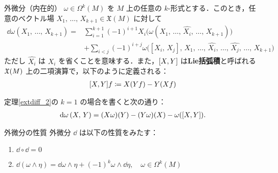 \documentclass[geometry_main]{subfiles}
\begin{document}
\begin{mytheo}[label=extdiff_2]{外微分（内在的）}
	$\omega \in \Omega^k(M)$ を $M$ 上の任意の $k$-形式とする．このとき，任意のベクトル場 $X_1,\, \dots ,\, X_{k+1} \in \mathfrak{X} (M)$ に対して
	\begin{align} 
		\dd{\omega} (X_1,\, \dots ,\, X_{k+1}) = &\sum_{i=1}^{k+1} (-1)^{i+1} X_i \bigl( \omega(X_1,\, \dots ,\, \hat{X_i},\, \dots,\, X_{k+1}) \bigr) \\
		&+ \sum_{i < j} (-1)^{i+j} \omega \bigl( [X_i,\, X_j],\, X_1,\, \dots ,\, \hat{X_i},\, \dots ,\, \hat{X_j},\, \dots ,\, X_{k+1} \bigr) 
	\end{align}
	ただし $\hat{X_i}$ は $X_i$ を省くことを意味する．また，$\comm{X}{Y}$ は\textbf{Lie括弧積}と呼ばれる $\mathfrak{X}(M)$ 上の二項演算で，以下のように定義される：
	\begin{align} 
		\comm{X}{Y}f \coloneqq X(Yf) - Y(Xf)
	\end{align}
\end{mytheo}

定理\ref{extdiff_2}の $k=1$ の場合を書くと次の通り：
\begin{align} 
	\dd{\omega}(X,\, Y) = (X\omega)(Y) - (Y\omega)(X) - \omega(\comm{X}{Y}).
\end{align}

\begin{mytheo}[label=extdiff_3]{外微分の性質}
	外微分 $\dd{}$ は以下の性質をみたす：
	\begin{enumerate} 
		\item $\dd{}\circ \dd{} = 0$
		\item $\dd{(\omega \wedge \eta)} = \dd{\omega} \wedge \eta + (-1)^k \omega \wedge \dd{\eta},\quad \omega \in \Omega^k(M)$
	\end{enumerate}
\end{mytheo}
\end{document}
